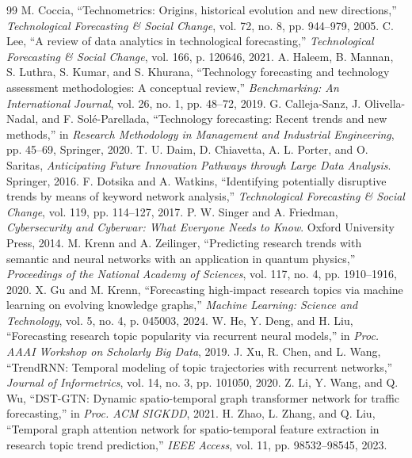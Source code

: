 \documentclass{article}
\begin{document}
\begin{thebibliography}{99}
   M. Coccia, ``Technometrics: Origins, historical evolution and new directions,'' \textit{Technological Forecasting \& Social Change}, vol. 72, no. 8, pp. 944--979, 2005.
   C. Lee, ``A review of data analytics in technological forecasting,'' \textit{Technological Forecasting \& Social Change}, vol. 166, p. 120646, 2021.
   A. Haleem, B. Mannan, S. Luthra, S. Kumar, and S. Khurana, ``Technology forecasting and technology assessment methodologies: A conceptual review,'' \textit{Benchmarking: An International Journal}, vol. 26, no. 1, pp. 48--72, 2019.
   G. Calleja-Sanz, J. Olivella-Nadal, and F. Solé-Parellada, ``Technology forecasting: Recent trends and new methods,'' in \textit{Research Methodology in Management and Industrial Engineering}, pp. 45--69, Springer, 2020.
   T. U. Daim, D. Chiavetta, A. L. Porter, and O. Saritas, \textit{Anticipating Future Innovation Pathways through Large Data Analysis}. Springer, 2016.
   F. Dotsika and A. Watkins, ``Identifying potentially disruptive trends by means of keyword network analysis,'' \textit{Technological Forecasting \& Social Change}, vol. 119, pp. 114--127, 2017.
   P. W. Singer and A. Friedman, \textit{Cybersecurity and Cyberwar: What Everyone Needs to Know}. Oxford University Press, 2014.
   M. Krenn and A. Zeilinger, ``Predicting research trends with semantic and neural networks with an application in quantum physics,'' \textit{Proceedings of the National Academy of Sciences}, vol. 117, no. 4, pp. 1910--1916, 2020.
   X. Gu and M. Krenn, ``Forecasting high-impact research topics via machine learning on evolving knowledge graphs,'' \textit{Machine Learning: Science and Technology}, vol. 5, no. 4, p. 045003, 2024.
   W. He, Y. Deng, and H. Liu, ``Forecasting research topic popularity via recurrent neural models,'' in \textit{Proc. AAAI Workshop on Scholarly Big Data}, 2019.
   J. Xu, R. Chen, and L. Wang, ``TrendRNN: Temporal modeling of topic trajectories with recurrent networks,'' \textit{Journal of Informetrics}, vol. 14, no. 3, pp. 101050, 2020.
   Z. Li, Y. Wang, and Q. Wu, ``DST-GTN: Dynamic spatio-temporal graph transformer network for traffic forecasting,'' in \textit{Proc. ACM SIGKDD}, 2021.
   H. Zhao, L. Zhang, and Q. Liu, ``Temporal graph attention network for spatio-temporal feature extraction in research topic trend prediction,'' \textit{IEEE Access}, vol. 11, pp. 98532--98545, 2023.
  \end{thebibliography}
\end{document}
